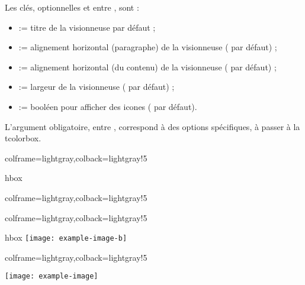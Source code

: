 \documentclass[11pt,a4paper]{ltxdoc}
\begin{document}
Les \textsf{clés}, optionnelles et entre \MontreCode{[...]}, sont :

\begin{itemize}
	\item {} := titre de la visionneuse par défaut ;
	\item {} := alignement horizontal (paragraphe) de la visionneuse ( par défaut) ;
	\item {} := alignement horizontal (du contenu) de la visionneuse ( par défaut) ;
	\item {} := largeur de la visionneuse ( par défaut) ;
	\item {} := booléen pour afficher des icones ( par défaut).
\end{itemize}

\medskip

L'argument obligatoire, entre , correspond à des options spécifiques, à passer à la \textsf{tcolorbox}.

\begin{tcblisting}{colframe=lightgray,colback=lightgray!5}
\begin{VisionnPDF}{hbox}
%
\end{VisionnPDF}
\end{tcblisting}

\begin{tcblisting}{colframe=lightgray,colback=lightgray!5}
\begin{VisionnPDF}[Largeur=14cm,Icones=false]{}
\end{VisionnPDF}
\end{tcblisting}

\begin{tcblisting}{colframe=lightgray,colback=lightgray!5}
\begin{VisionnIMG}[Icones=false]{hbox}
\texttt{[image: example-image-b]}
\end{VisionnIMG}
\end{tcblisting}

\begin{tcblisting}{colframe=lightgray,colback=lightgray!5}
\begin{VisionnIMG}[Largeur=12cm]{}
\texttt{[image: example-image]}
\end{VisionnIMG}
\end{tcblisting}
\end{document}
